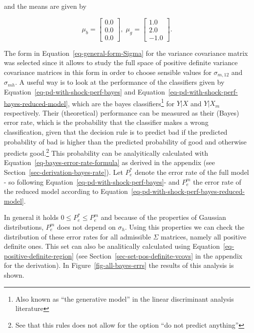 \documentclass[
  12pt,
]{article}
\begin{document}
and the means are given by

\[
\mu_{b} = \begin{bmatrix}
    0.0\\
    0.0\\
    0.0
\end{bmatrix}, \; \mu_{g} = \begin{bmatrix}
    1.0\\
    2.0\\
    -1.0
\end{bmatrix}.
\]

The form in Equation~\ref{eq-general-form-Sigma} for the variance
covariance matrix was selected since it allows to study the full space
of positive definite variance covariance matrices in this form in order
to choose sensible values for \(\sigma_{m, 12}\) and \(\sigma_{mh}\). A
useful way is to look at the performance of the classifiers given by
Equation~\ref{eq-pd-with-shock-perf-bayes} and
Equation~\ref{eq-pd-with-shock-perf-bayes-reduced-model}, which are the
bayes classifiers\footnote{ Also known as ``the generative model'' in
  the linear discriminant analysis literature} for \(Y | X\) and
\(Y | X_m\) respectively. Their (theoretical) performance can be
measured as their (Bayes) error rate, which is the probability that the
classifier makes a wrong classification, given that the decision rule is
to predict bad if the predicted probability of bad is higher than the
predicted probability of good and otherwise predicts good.\footnote{ See
  that this rules does not allow for the option ``do not predict
  anything''} This probability can be analyitically calculated with
Equation~\ref{eq-bayes-error-rate-formula} as derived in the appendix
(see Section~\ref{sec-derivation-bayes-rate}). Let \(P_e^{*}\) denote
the error rate of the full model - so following
Equation~\ref{eq-pd-with-shock-perf-bayes}- and \(P^m_e\) the error rate
of the reduced model according to
Equation~\ref{eq-pd-with-shock-perf-bayes-reduced-model}.

In general it holds \(0 \leq P_e^{*} \leq P^m_e\) and because of the
properties of Gaussian distributions, \(P^m_e\) does not depend on
\(\sigma_h\). Using this properties we can check the distribution of
these error rates for all admissible \(\Sigma\) matrices, namely all
positive definite ones. This set can also be analitically calculated
using Equation~\ref{eq-positive-definite-region} (see
Section~\ref{sec-set-pos-definite-vcovs} in the appendix for the
derivation). In Figure~\ref{fig-all-bayes-errs} the results of this
analysis is shown.
\end{document}

